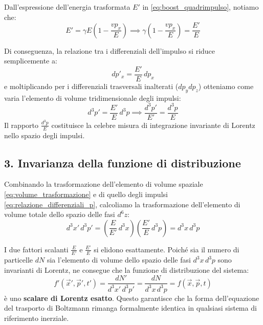 \documentclass[11pt, a4paper, oneside]{scrreprt}
\begin{document}
Dall'espressione dell'energia trasformata $E'$ in \eqref{eq:boost_quadrimpulso}, notiamo che:
\begin{equation}
    E' = \gamma E \left( 1 - \frac{v p_x}{E} \right) \implies \gamma \left( 1 - \frac{v p_x}{E} \right) = \frac{E'}{E}
\end{equation}

Di conseguenza, la relazione tra i differenziali dell'impulso si riduce semplicemente a:
\begin{equation} \label{eq:relazione_differenziali_p}
    dp'_x = \frac{E'}{E} \, dp_x
\end{equation}
e moltiplicando per i differenziali trasversali inalterati ($dp_y dp_z$) otteniamo come varia l'elemento di volume tridimensionale degli impulsi:
\begin{equation}
    d^3p' = \frac{E'}{E} \, d^3p \implies \frac{d^3p'}{E'} = \frac{d^3p}{E}
\end{equation}
Il rapporto $\frac{d^3p}{E}$ costituisce la celebre misura di integrazione invariante di Lorentz nello spazio degli impulsi.

\subsection*{3. Invarianza della funzione di distribuzione}

Combinando la trasformazione dell'elemento di volume spaziale \eqref{eq:volume_trasformazione} e di quello degli impulsi \eqref{eq:relazione_differenziali_p}, calcoliamo la trasformazione dell'elemento di volume totale dello spazio delle fasi $d^6z$:
\begin{equation} \label{eq:invarianza_spazio_fasi}
    d^3x' \, d^3p' = \left( \frac{E}{E'} \, d^3x \right) \left( \frac{E'}{E} \, d^3p \right) = d^3x \, d^3p
\end{equation}

I due fattori scalanti $\frac{E}{E'}$ e $\frac{E'}{E}$ si elidono esattamente. Poiché sia il numero di particelle $dN$ sia l'elemento di volume dello spazio delle fasi $d^3x \, d^3p$ sono invarianti di Lorentz, ne consegue che la funzione di distribuzione del sistema:
\begin{equation}
    f'(\vec{x}', \vec{p}', t') = \frac{dN'}{d^3x' \, d^3p'} = \frac{dN}{d^3x \, d^3p} = f(\vec{x}, \vec{p}, t)
\end{equation}
è uno \textbf{scalare di Lorentz esatto}.
Questo garantisce che la forma dell'equazione del trasporto di Boltzmann rimanga formalmente identica in qualsiasi sistema di riferimento inerziale.
\end{document}
